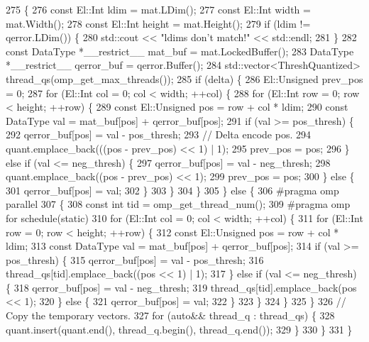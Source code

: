 \begin{DoxyCode}
275                                      \{
276   \textcolor{keyword}{const} El::Int ldim = mat.LDim();
277   \textcolor{keyword}{const} El::Int width = mat.Width();
278   \textcolor{keyword}{const} El::Int height = mat.Height();
279   \textcolor{keywordflow}{if} (ldim != qerror.LDim()) \{
280     std::cout << \textcolor{stringliteral}{"ldims don't match!"} << std::endl;
281   \}
282   \textcolor{keyword}{const} DataType *\_\_restrict\_\_ mat\_buf = mat.LockedBuffer();
283   DataType *\_\_restrict\_\_ qerror\_buf = qerror.Buffer();
284   std::vector<ThreshQuantized> thread\_qs(omp\_get\_max\_threads());
285   \textcolor{keywordflow}{if} (delta) \{
286     El::Unsigned prev\_pos = 0;
287     \textcolor{keywordflow}{for} (El::Int col = 0; col < width; ++col) \{
288       \textcolor{keywordflow}{for} (El::Int row = 0; row < height; ++row) \{
289         \textcolor{keyword}{const} El::Unsigned pos = row + col * ldim;
290         \textcolor{keyword}{const} DataType val = mat\_buf[pos] + qerror\_buf[pos];
291         \textcolor{keywordflow}{if} (val >= pos\_thresh) \{
292           qerror\_buf[pos] = val - pos\_thresh;
293           \textcolor{comment}{// Delta encode pos.}
294           quant.emplace\_back(((pos - prev\_pos) << 1) | 1);
295           prev\_pos = pos;
296         \} \textcolor{keywordflow}{else} \textcolor{keywordflow}{if} (val <= neg\_thresh) \{
297           qerror\_buf[pos] = val - neg\_thresh;
298           quant.emplace\_back((pos - prev\_pos) << 1);
299           prev\_pos = pos;
300         \} \textcolor{keywordflow}{else} \{
301           qerror\_buf[pos] = val;
302         \}
303       \}
304     \}
305   \} \textcolor{keywordflow}{else} \{
306 \textcolor{preprocessor}{    #pragma omp parallel}
307     \{
308       \textcolor{keyword}{const} \textcolor{keywordtype}{int} tid = omp\_get\_thread\_num();
309 \textcolor{preprocessor}{      #pragma omp for schedule(static)}
310       \textcolor{keywordflow}{for} (El::Int col = 0; col < width; ++col) \{
311         \textcolor{keywordflow}{for} (El::Int row = 0; row < height; ++row) \{
312           \textcolor{keyword}{const} El::Unsigned pos = row + col * ldim;
313           \textcolor{keyword}{const} DataType val = mat\_buf[pos] + qerror\_buf[pos];
314           \textcolor{keywordflow}{if} (val >= pos\_thresh) \{
315             qerror\_buf[pos] = val - pos\_thresh;
316             thread\_qs[tid].emplace\_back((pos << 1) | 1);
317           \} \textcolor{keywordflow}{else} \textcolor{keywordflow}{if} (val <= neg\_thresh) \{
318             qerror\_buf[pos] = val - neg\_thresh;
319             thread\_qs[tid].emplace\_back(pos << 1);
320           \} \textcolor{keywordflow}{else} \{
321             qerror\_buf[pos] = val;
322           \}
323         \}
324       \}
325     \}
326     \textcolor{comment}{// Copy the temporary vectors.}
327     \textcolor{keywordflow}{for} (\textcolor{keyword}{auto}&& thread\_q : thread\_qs) \{
328       quant.insert(quant.end(), thread\_q.begin(), thread\_q.end());
329     \}
330   \}
331 \}
\end{DoxyCode}
